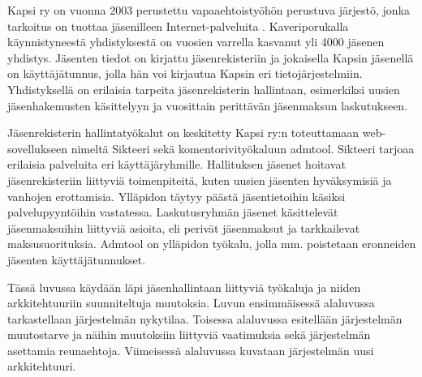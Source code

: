 Kapsi ry on vuonna 2003 perustettu vapaaehtoistyöhön perustuva järjestö, jonka tarkoitus on tuottaa jäsenilleen Internet-palveluita \cite{kapsifi}. Kaveriporukalla käynnistyneestä yhdistyksestä on vuosien varrella kasvanut yli 4000 jäsenen yhdistys. Jäsenten tiedot on kirjattu jäsenrekisteriin ja jokaisella Kapsin jäsenellä on käyttäjätunnus, jolla hän voi kirjautua Kapsin eri tietojärjestelmiin. Yhdistyksellä on erilaisia tarpeita jäsenrekisterin hallintaan, esimerkiksi uusien jäsenhakemusten käsittelyyn ja vuosittain perittävän jäsenmaksun laskutukseen.

Jäsenrekisterin hallintatyökalut on keskitetty Kapsi ry:n toteuttamaan web-so\-vel\-luk\-seen nimeltä Sikteeri sekä komentorivityökaluun admtool. Sikteeri tarjoaa erilaisia palveluita eri käyttäjäryhmille. Hallituksen jäsenet hoitavat jäsenrekisteriin liittyviä toimenpiteitä, kuten uusien jäsenten hyväksymisiä ja vanhojen erottamisia. Ylläpidon täytyy päästä jäsentietoihin käsiksi palvelupyyntöihin vastatessa. Laskutusryhmän jäsenet käsittelevät jäsenmaksuihin liittyviä asioita, eli perivät jäsenmaksut ja tarkkailevat maksusuorituksia. Admtool on ylläpidon työkalu, jolla mm. poistetaan eronneiden jäsenten käyttäjätunnukset.

Tässä luvussa käydään läpi jäsenhallintaan liittyviä työkaluja ja niiden arkkitehtuuriin suunniteltuja muutoksia. Luvun ensimmäisessä alaluvussa tarkastellaan järjestelmän nykytilaa. Toisessa alaluvussa esitellään järjestelmän muutostarve ja näihin muutoksiin liittyviä vaatimuksia sekä järjestelmän asettamia reunaehtoja. Viimeisessä alaluvussa kuvataan järjestelmän uusi arkkitehtuuri.